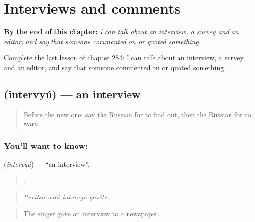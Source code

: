 
\chapter{Interviews and comments}
\label{ch:ru-interviews-and-comments}

\begin{chapteropening}
\textbf{By the end of this chapter:} \emph{I can talk about an interview, a survey and an editor, and say that someone commented on or quoted something.}

Complete the last lesson of chapter 284: I can talk about an interview, a survey and an editor, and say that someone commented on or quoted something.
\end{chapteropening}

\section[\texorpdfstring{\ru{интервью} (intervyú)}{интервью (intervyú)}]{ (intervyú) — an interview}

\label{lesson:RU-C284-intervyu}



\begin{quote}
Before the new one: say the Russian for to find out, then the Russian for to warn.
\end{quote}

\subsection*{You'll want to know: }
\textbf{} (\emph{intervyú}) — \textquotedblleft{}an interview\textquotedblright{}.

\begin{quote}
   .
\end{quote}

\begin{quote}
\emph{Pevítsa dalá intervyú gazéte.}
\end{quote}

\begin{quote}
The singer gave an interview to a newspaper.
\end{quote}

